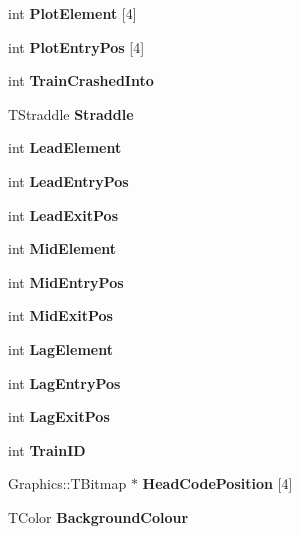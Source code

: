 \begin{DoxyCompactItemize}
int {\bfseries Plot\+Element} \mbox{[}4\mbox{]}
\item 
\mbox{\label{class_t_train_ac4ff3ae93a80d230d1ddcb992b0b546a}} 
int {\bfseries Plot\+Entry\+Pos} \mbox{[}4\mbox{]}
\item 
\mbox{\label{class_t_train_ad7644b30da32d0d9e6541ba7629a4a35}} 
int {\bfseries Train\+Crashed\+Into}
\item 
\mbox{\label{class_t_train_aba7fc74449b392035805ecc4f2bc1650}} 
T\+Straddle {\bfseries Straddle}
\item 
\mbox{\label{class_t_train_abba9596f03b731ba4055f4d3591f5b0e}} 
int {\bfseries Lead\+Element}
\item 
\mbox{\label{class_t_train_ae5acbf95c32fbf654e4f68417032edad}} 
int {\bfseries Lead\+Entry\+Pos}
\item 
\mbox{\label{class_t_train_af92045cb9d4cb0fa368d1541e4fb2780}} 
int {\bfseries Lead\+Exit\+Pos}
\item 
\mbox{\label{class_t_train_a6f92853cac4bf9f463effe07c2432270}} 
int {\bfseries Mid\+Element}
\item 
\mbox{\label{class_t_train_a9594b786d0a6d35cfa82b1084f90c82f}} 
int {\bfseries Mid\+Entry\+Pos}
\item 
\mbox{\label{class_t_train_a6c0d3ad2ffe11093982406e5d449bbd1}} 
int {\bfseries Mid\+Exit\+Pos}
\item 
\mbox{\label{class_t_train_ab2b55af1125e9cd1dcbad6d890a33edb}} 
int {\bfseries Lag\+Element}
\item 
\mbox{\label{class_t_train_a8d164779b76b56ab0508197280cb0180}} 
int {\bfseries Lag\+Entry\+Pos}
\item 
\mbox{\label{class_t_train_a79b51b68b8e6c0f48330aaf3a99ee5c6}} 
int {\bfseries Lag\+Exit\+Pos}
\item 
\mbox{\label{class_t_train_a95a26f26e890d53e38f1f8067977ef0e}} 
int {\bfseries Train\+ID}
\item 
\mbox{\label{class_t_train_a9b4cfd30341ab156b539eb3a5a9fe7a3}} 
Graphics\+::\+T\+Bitmap $\ast$ {\bfseries Head\+Code\+Position} \mbox{[}4\mbox{]}
\item 
\mbox{\label{class_t_train_acee68f1e0863f2dc008a69f9c4be0fe6}} 
T\+Color {\bfseries Background\+Colour}
\end{DoxyCompactItemize}
